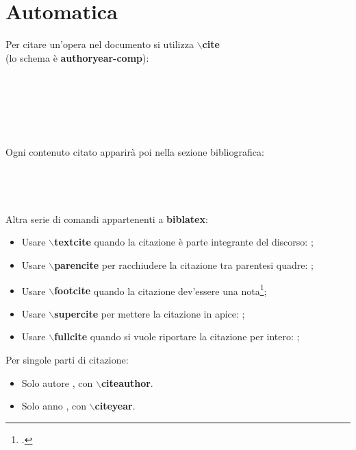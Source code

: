 \documentclass[a4paper,12pt,oneside]{book}
\theoremstyle{plain}
\begin{document}
	\section{Automatica}
	Per citare un'opera nel documento si utilizza \textbf{$\backslash$cite}\\(lo schema è \textbf{authoryear-comp}):\\
	\cite{man:sposi}\\
	\cite[1]{man:sposi}\\
	\cite[8-13]{man:sposi}\\
	\cite[vedi][]{man:sposi}\\
	\cite[vedi][1]{man:sposi}\\
	\\
	Ogni contenuto citato apparirà poi nella sezione bibliografica:\\
	\cite{tube:canale}\\
	\cite[vedi][]{tube:canale}\\
	\cite[vedi][20]{corriere:giornale}\\
	\\
	Altra serie di comandi appartenenti a \textbf{biblatex}:
	\begin{itemize}
		\item Usare \textbf{$\backslash$textcite} quando la citazione è parte integrante del discorso: \textcite{man:sposi};
		
		\item Usare \textbf{$\backslash$parencite} per racchiudere la citazione tra parentesi quadre: \parencite{corriere:giornale};
		
		\item Usare \textbf{$\backslash$footcite} quando la citazione dev'essere una nota\footcite{tube:canale};
		
		\item Usare \textbf{$\backslash$supercite} per mettere la citazione in apice: \supercite{man:sposi};
		
		\item Usare \textbf{$\backslash$fullcite} quando si vuole riportare la citazione per intero: ;
	\end{itemize}
	Per singole parti di citazione:
	\begin{itemize}
		\item Solo autore \citeauthor{tube:canale}, con \textbf{$\backslash$citeauthor}.
		\item Solo anno \citeyear{corriere:giornale}, con \textbf{$\backslash$citeyear}.
	\end{itemize}
		
\end{document}
